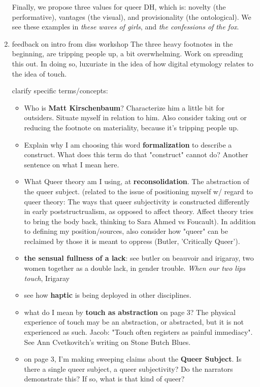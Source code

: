 \documentclass[11pt]{article}
\begin{document}
\begin{enumerate}
Finally, we propose three values for queer DH, which is: novelty (the
performative), vantages (the visual), and provisionality (the
ontological). We see these examples in \emph{these waves of girls}, and
\emph{the confessions of the fox}.

\item feedback on intro from diss workshop
\label{sec:orgc92657c}
The three heavy footnotes in the beginning, are tripping people up, a
bit overwhelming. Work on spreading this out. In doing so, luxuriate
in the idea of how digital etymology relates to the idea of touch.

clarify specific terms/concepts: 
\begin{itemize}
\item Who is \textbf{\textbf{Matt Kirschenbaum}}? Characterize him a little bit for
outsiders. Situate myself in relation to him. Also consider taking
out or reducing the footnote on materiality, because it's tripping
people up.
\item Explain why I am choosing this word \textbf{\textbf{formalization}} to describe a
construct. What does this term do that "construct" cannot do?
Another sentence on what I mean here.
\item What Queer theory am I using, at \textbf{\textbf{reconsolidation}}. The
abstraction of the queer subject. (related to the issue of
positioning myself w/ regard to queer theory: The ways that queer
subjectivity is constructed differently in early poststructrualism,
as opposed to affect theory. Affect theory tries to bring the body
back, thinking to Sara Ahmed vs Foucault). In addition to defining
my position/sources, also consider how "queer" can be reclaimed by
those it is meant to oppress (Butler, 'Critically Queer').
\item \textbf{\textbf{the sensual fullness of a lack}}: see butler on beauvoir and
irigaray, two women together as a double lack, in gender
trouble. \emph{When our two lips touch}, Irigaray
\item see how \textbf{\textbf{haptic}} is being deployed in other disciplines.
\item what do I mean by \textbf{\textbf{touch as abstraction}} on page 3? The physical
experience of touch may be an abstraction, or abstracted, but it is
not experienced as such. Jacob: "Touch often registers as painful
immediacy". See Ann Cvetkovitch's writing on Stone Butch Blues.
\item on page 3, I'm making sweeping claims about the \textbf{\textbf{Queer
Subject}}. Is there a single queer subject, a queer subjectivity? Do
the narrators demonstrate this? If so, what is that kind of queer?
\end{itemize}


\end{enumerate}
\end{document}
